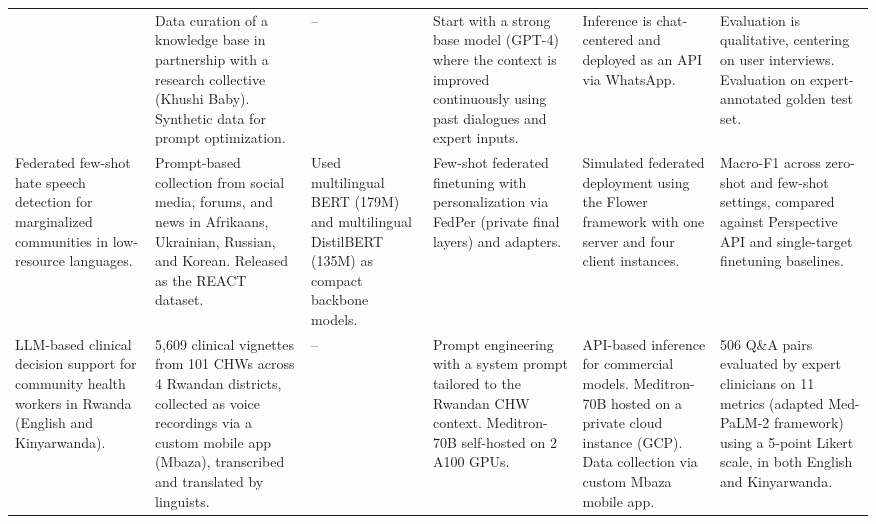 \begin{table}[ht]
{\begin{tabular}{p{3cm} p{2.5cm} p{2.5cm} p{2.5cm} p{2.5cm} p{2.5cm}}
        & Data curation of a knowledge base in partnership with a research collective (Khushi Baby). Synthetic data for prompt optimization.
        & --
        & Start with a strong base model (GPT-4) where the context is improved continuously using past dialogues and expert inputs.
        & Inference is chat-centered and deployed as an API via WhatsApp.
        & Evaluation is qualitative, centering on user interviews. Evaluation on expert-annotated golden test set.
    \\
    \textbf{\citet{ye-etal-2025-federated}}
        Federated few-shot hate speech detection for marginalized communities in low-resource languages.
        & Prompt-based collection from social media, forums, and news in Afrikaans, Ukrainian, Russian, and Korean. Released as the REACT dataset.
        & Used multilingual BERT (179M) and multilingual DistilBERT (135M) as compact backbone models.
        & Few-shot federated finetuning with personalization via FedPer (private final layers) and adapters.
        & Simulated federated deployment using the Flower framework with one server and four client instances.
        & Macro-F1 across zero-shot and few-shot settings, compared against Perspective API and single-target finetuning baselines.
    \\
    \textbf{\citet{rutunda-etal-2026-large}}
        LLM-based clinical decision support for community health workers in Rwanda (English and Kinyarwanda).
        & 5,609 clinical vignettes from 101 CHWs across 4 Rwandan districts, collected as voice recordings via a custom mobile app (Mbaza), transcribed and translated by linguists.
        & --
        & Prompt engineering with a system prompt tailored to the Rwandan CHW context. Meditron-70B self-hosted on 2 A100 GPUs.
        & API-based inference for commercial models. Meditron-70B hosted on a private cloud instance (GCP). Data collection via custom Mbaza mobile app.
        & 506 Q\&A pairs evaluated by expert clinicians on 11 metrics (adapted Med-PaLM-2 framework) using a 5-point Likert scale, in both English and Kinyarwanda.
    \\

\end{tabular}}
\end{table}
